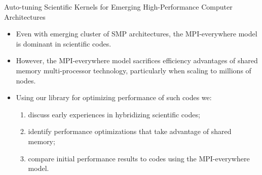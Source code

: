 \begin{frame}{Auto-tuning Scientific Kernels for Emerging High-Performance Computer Architectures} 
\begin{itemize}
    \small \item \small Even with emerging cluster of SMP architectures, the MPI-everywhere model is dominant in scientific codes. 
    \item \small However, the MPI-everywhere model sacrifices efficiency advantages of shared memory multi-processor technology, particularly when scaling to millions of nodes. 
    \item \small Using our library for optimizing performance of such codes we: 
    \begin{enumerate}
      \tiny \item \tiny discuss early experiences in hybridizing scientific codes; 
      \item \tiny identify performance optimizations that take advantage of shared memory;
      \item \tiny compare initial performance results to codes using the MPI-everywhere model.
    \end{enumerate}
\end{itemize}
\end{frame}

